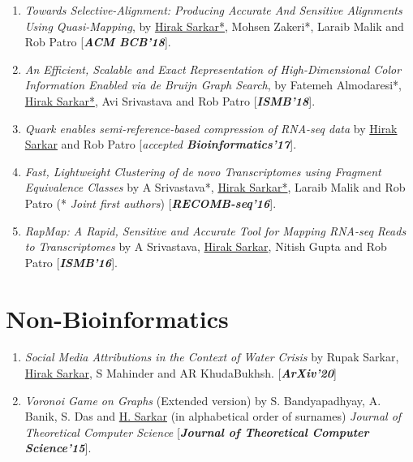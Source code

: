 \documentclass{res}
\begin{document}
\begin{resume}
\begin{enumerate}
\item {\it Towards Selective-Alignment: Producing Accurate And Sensitive Alignments Using Quasi-Mapping}, by \underline{Hirak Sarkar*}, Mohsen Zakeri*, Laraib Malik and Rob Patro [\textit{\textbf{ACM BCB'18}}]. 

\item {\it An Efficient, Scalable and Exact Representation of High-Dimensional Color Information Enabled via de Bruijn Graph Search}, by Fatemeh Almodaresi*, \underline{Hirak Sarkar*}, Avi Srivastava and Rob Patro [\textit{\textbf{ISMB'18}}]. 

\item   {\it Quark enables semi-reference-based compression of RNA-seq data} by  \underline{Hirak Sarkar} and Rob Patro [\textit{accepted \textbf {Bioinformatics'17}}].


\item   {\it Fast, Lightweight Clustering of de novo Transcriptomes using Fragment Equivalence Classes} by A Srivastava*, \underline{Hirak Sarkar*}, Laraib Malik and Rob Patro (* \textit{Joint first authors}) [\textit{\textbf{RECOMB-seq'16}}]. 


\item {\it RapMap: A Rapid, Sensitive and Accurate Tool for Mapping RNA-seq Reads to Transcriptomes} by A Srivastava, \underline{Hirak Sarkar}, Nitish Gupta and Rob Patro  [\textit{\textbf{ISMB'16}}].

\end{enumerate}
\section{Non-Bioinformatics}
\begin{enumerate}
  \item {\it Social Media Attributions in the Context of Water Crisis} by Rupak Sarkar, \underline{Hirak Sarkar}, S Mahinder and AR KhudaBukhsh.  [\textit{\textbf{ArXiv'20}}] 
  \item {\it Voronoi Game on Graphs} (Extended version) by S. Bandyapadhyay, A. Banik, S. Das and \underline{H. Sarkar} (in alphabetical order of surnames) {\it Journal of Theoretical Computer Science}  [\textit{\textbf{Journal of Theoretical Computer Science'15}}].
\end{enumerate}
\vspace{-0.5cm}

\end{resume}
\end{document}
